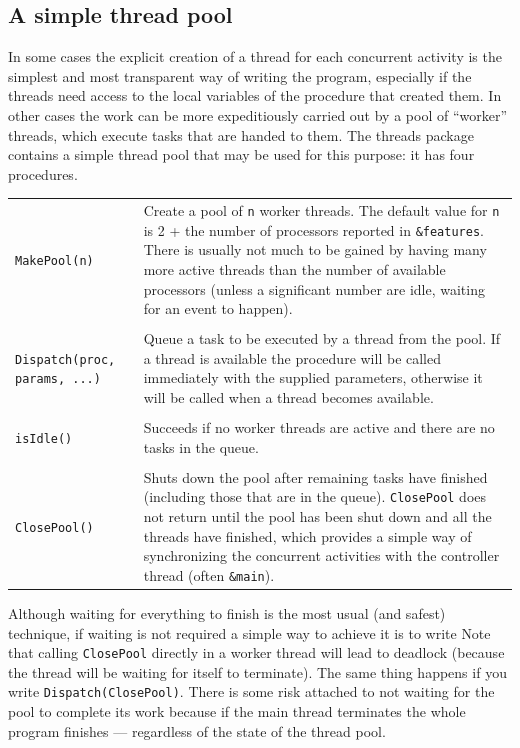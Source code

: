 \subsection*{A simple thread pool}
In some cases the explicit creation of a thread for each concurrent activity is
the simplest and most transparent way of writing the program, especially if the
threads need access to the local variables of the procedure that created them.
In other cases the work can be more expeditiously carried out by a pool of
``worker'' threads, which execute tasks that are handed to them.  The threads
package contains a simple thread pool that may be used for this purpose: it has
four procedures.
\begin{flushleft}
\tablehead{}
\begin{supertabular}{p{2in} p{4in}}
\texttt{MakePool(n)} & 
Create a pool of \texttt{n} worker threads. The default value for \texttt{n} is
2 + the number of processors reported in \texttt{\&features}. There is usually
not much to be gained by having many more active threads than the number of
available processors (unless a significant number are idle, waiting for an event
to happen).\\
&\\
\texttt{Dispatch(proc, params, ...)} &
Queue a task to be executed by a thread from the pool. If a thread is available
the procedure will be called immediately with the supplied parameters, otherwise
it will be called when a thread becomes available.\\
&\\
\texttt{isIdle()} &
Succeeds if no worker threads are active and there are no tasks in the queue.\\
&\\
\texttt{ClosePool()} & Shuts down the pool after remaining tasks have finished
(including those that are in the queue). \texttt{ClosePool} does not return
until the pool has been shut down and all the threads have finished, which
provides a simple way of synchronizing the concurrent activities with the
controller thread (often \texttt{\&main}).\\
\end{supertabular}
\end{flushleft}

Although waiting for everything to finish is the most usual (and safest)
technique, if waiting is not required a simple way to achieve it is to write
{\small
{}
}
Note that calling \texttt{ClosePool} directly in a worker thread will lead to
deadlock (because the thread will be waiting for itself to terminate).  The same
thing happens if you write \texttt{Dispatch(ClosePool)}.  There is some risk
attached to not waiting for the pool to complete its work because if the main
thread terminates the whole program finishes --- regardless of the state of the
thread pool.

